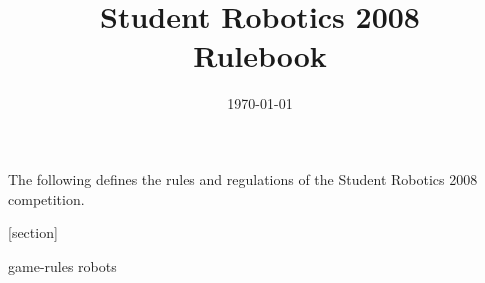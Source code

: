 \documentclass[a4paper, 12pt]{article}
\title {Student Robotics 2008\\ Rulebook}
\date{\today}
\begin{document}
\maketitle

\noindent The following defines the rules and regulations of the Student Robotics 2008 competition.

[section]
\newcommand{\rcn}{\stepcounter{rule}\arabic{section}.\arabic{rule}}
\renewcommand{\labelenumi}{\rcn}

 {game-rules}
 {robots}
\end{document}
